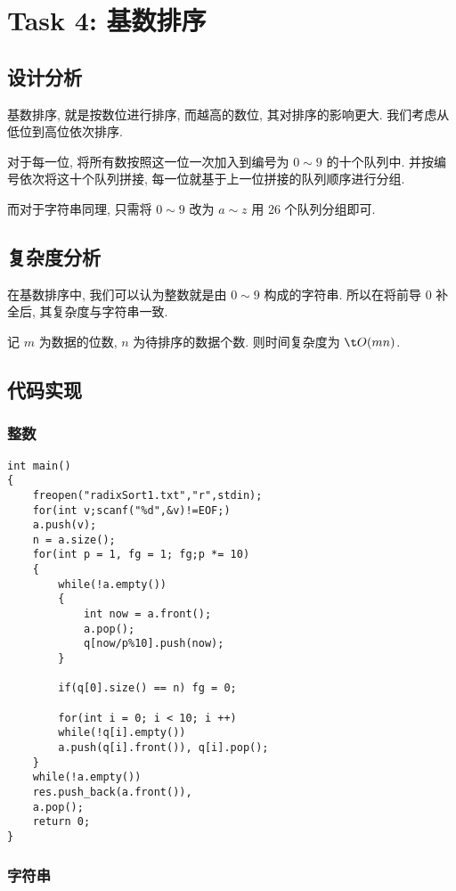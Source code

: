 \section{Task 4: 基数排序}

\subsection{设计分析}

基数排序, 就是按数位进行排序, 而越高的数位, 其对排序的影响更大. 我们考虑从低位到高位依次排序.

对于每一位, 将所有数按照这一位一次加入到编号为 $0\sim 9$ 的十个队列中. 并按编号依次将这十个队列拼接, 每一位就基于上一位拼接的队列顺序进行分组.

而对于字符串同理, 只需将 $0\sim 9$ 改为 $a\sim z$ 用 26 个队列分组即可.

\subsection{复杂度分析}

在基数排序中, 我们可以认为整数就是由 $0\sim 9$ 构成的字符串. 所以在将前导 $0$ 补全后, 其复杂度与字符串一致.

记 $m$ 为数据的位数, $n$ 为待排序的数据个数. 则时间复杂度为 $\t O(mn)$.

\subsection{代码实现}

\subsubsection{整数}

\begin{lstlisting}
int main()
{
	freopen("radixSort1.txt","r",stdin);
	for(int v;scanf("%d",&v)!=EOF;)
	a.push(v);
	n = a.size();
	for(int p = 1, fg = 1; fg;p *= 10)
	{
		while(!a.empty())
		{
			int now = a.front();
			a.pop();
			q[now/p%10].push(now);
		}
		
		if(q[0].size() == n) fg = 0;
		
		for(int i = 0; i < 10; i ++)
		while(!q[i].empty())
		a.push(q[i].front()), q[i].pop();
	}
	while(!a.empty()) 
	res.push_back(a.front()),
	a.pop();
	return 0;
}

\end{lstlisting}

\subsubsection{字符串}

